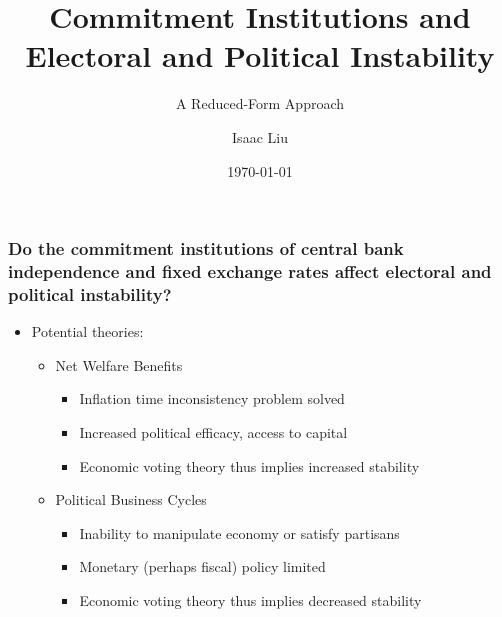 \documentclass{beamer}
\title[Commitment Institutions and Instability]{Commitment Institutions and Electoral and Political Instability}
\subtitle{A Reduced-Form Approach}
\author{Isaac Liu}
\date{\today}
\begin{document}
    \begin{frame}
        \titlepage
    \end{frame}

    \begin{frame}
        \frametitle{\small Do the commitment institutions of central bank independence and fixed exchange rates affect electoral and political instability?}
        \begin{itemize}
            \item Potential theories:
            \begin{itemize}
                \item Net Welfare Benefits
                \begin{itemize}
                    \item Inflation time inconsistency problem solved
                    \item Increased political efficacy, access to capital
                    \item Economic voting theory thus implies increased stability
                \end{itemize}
                \item Political Business Cycles
                \begin{itemize}
                    \item Inability to manipulate economy or satisfy partisans
                    \item Monetary (perhaps fiscal) policy limited
                    \item Economic voting theory thus implies decreased stability
                \end{itemize}
            \end{itemize}
        \end{itemize}

        \begin{figure}[h]
    

\end{figure}
\end{frame}
\end{document}
